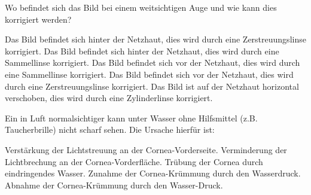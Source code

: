 \documentclass[11pt]{exam}
\begin{document}
\begin{questions}
\vspace{3mm}\question Wo befindet sich das Bild bei einem weitsichtigen Auge und wie kann dies korrigiert werden?

\begin{choices}
	\choice Das Bild befindet sich hinter der Netzhaut, dies wird durch eine Zerstreuungslinse korrigiert.
	\choice Das Bild befindet sich hinter der Netzhaut, dies wird durch eine Sammellinse korrigiert.
	\choice Das Bild befindet sich vor der Netzhaut, dies wird durch eine Sammellinse korrigiert.
	\choice Das Bild befindet sich vor der Netzhaut, dies wird durch eine Zerstreuungslinse korrigiert.
	\choice Das Bild ist auf der Netzhaut horizontal verschoben, dies wird durch eine Zylinderlinse korrigiert.
\end{choices}

\vspace{3mm}\question Ein in Luft normalsichtiger kann unter Wasser ohne Hilfsmittel (z.B. Taucherbrille) nicht scharf sehen. Die Ursache hierfür ist:

\begin{choices}
	\choice Verstärkung der Lichtstreuung an der Cornea-Vorderseite.
	\choice Verminderung der Lichtbrechung an der Cornea-Vorderfläche.
	\choice Trübung der Cornea durch eindringendes Wasser.
	\choice Zunahme der Cornea-Krümmung durch den Wasserdruck.
	\choice Abnahme der Cornea-Krümmung durch den Wasser-Druck.
\end{choices}

\vspace{3mm}\end{questions}
\end{document}
